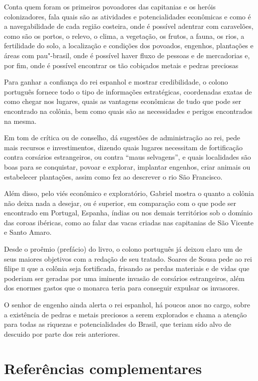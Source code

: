 \documentclass[12pt]{extarticle}
\begin{document}
Conta quem foram os primeiros povoadores das capitanias e os heróis
colonizadores, fala quais são as atividades e potencialidades econômicas
e como é a navegabilidade de cada região costeira, onde é possível
adentrar com caravelões, como são os portos, o relevo, o clima, a
vegetação, os frutos, a fauna, os rios, a fertilidade do solo, a
localização e condições dos povoados, engenhos, plantações e áreas com
pau"-brasil, onde é possível haver fluxo de pessoas e de mercadorias e,
por fim, onde é possível encontrar os tão cobiçados metais e pedras
preciosas

Para ganhar a confiança do rei espanhol e mostrar credibilidade, o
colono português fornece todo o tipo de informações estratégicas,
coordenadas exatas de como chegar nos lugares, quais as vantagens
econômicas de tudo que pode ser encontrado na colônia, bem como quais
são as necessidades e perigos encontrados na mesma.

Em tom de crítica ou de conselho, dá sugestões de administração ao rei,
pede mais recursos e investimentos, dizendo quais lugares necessitam de
fortificação contra corsários estrangeiros, ou contra ``maus
selvagens'', e quais localidades são boas para se conquistar, povoar e
explorar, implantar engenhos, criar animais ou estabelecer plantações,
assim como fez ao descrever o rio São Francisco.

Além disso, pelo viés econômico e exploratório, Gabriel mostra o quanto
a colônia não deixa nada a desejar, ou é superior, em comparação com o
que pode ser encontrado em Portugal, Espanha, índias ou nos demais
territórios sob o domínio das coroas ibéricas, como ao falar das vacas
criadas nas capitanias de São Vicente e Santo Amaro.

Desde o proêmio (prefácio) do livro, o colono português já deixou claro
um de seus maiores objetivos com a redação de seu tratado.
Soares de Sousa pede ao rei filipe \textsc{ii} que a colônia seja fortificada,
frisando as perdas materiais e de vidas que poderiam ser geradas por uma
iminente invasão de corsários estrangeiros, além dos enormes gastos que
o monarca teria para conseguir expulsar os invasores.

O senhor de engenho ainda alerta o rei espanhol, há poucos anos no
cargo, sobre a existência de pedras e metais preciosos a serem
explorados e chama a atenção para todas as riquezas e potencialidades do
Brasil, que teriam sido alvo de descuido por parte dos reis anteriores.

\section{Referências complementares}
\end{document}
